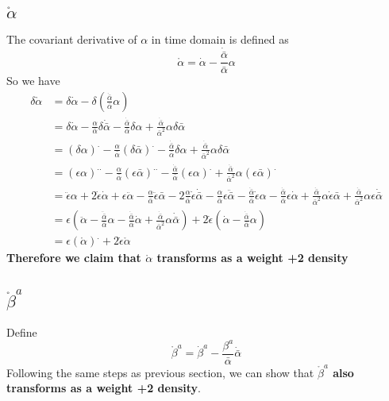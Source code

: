 \documentclass{article}
\begin{document}
\subsection{$\mathring{\alpha}$}
The covariant derivative of $\alpha$ in time domain is defined as
\[
\mathring{\alpha} = \dot{\alpha} - \frac{\dot{\bar{\alpha}}}{\bar{\alpha}}\alpha
\]
So we have
\begin{align*}
\delta \mathring{\alpha} & = \delta \dot{\alpha} - \delta (\frac{\dot{\bar{\alpha}}}{\bar{\alpha}}\alpha)\\
& = \delta \dot{\alpha} - \frac{\alpha}{\bar{\alpha}}\delta \dot{\bar{\alpha}} - \frac{\dot{\bar{\alpha}}}{\bar{\alpha}}\delta\alpha + \frac{\dot{\bar{\alpha}}}{\bar{\alpha}^2}\alpha \delta \bar{\alpha}\\
& = (\delta \alpha)^{.} - \frac{\alpha}{\bar{\alpha}}(\delta \bar{\alpha})^{.} - \frac{\dot{\bar{\alpha}}}{\bar{\alpha}}\delta\alpha + \frac{\dot{\bar{\alpha}}}{\bar{\alpha}^2}\alpha \delta \bar{\alpha}\\
& = (\epsilon \alpha)^{..} - \frac{\alpha}{\bar{\alpha}}(\epsilon \bar{\alpha})^{..} - \frac{\dot{\bar{\alpha}}}{\bar{\alpha}}(\epsilon\alpha)^{.} + \frac{\dot{\bar{\alpha}}}{\bar{\alpha}^2}\alpha (\epsilon \bar{\alpha})^{.}\\
& = \ddot{\epsilon}\alpha + 2\dot{\epsilon}\dot{\alpha} + \epsilon\ddot{\alpha} -  \frac{\alpha}{\bar{\alpha}}\ddot{\epsilon}\bar{\alpha} - 2 \frac{\alpha}{\bar{\alpha}}\dot{\epsilon}\dot{\bar{\alpha}} -  \frac{\alpha}{\bar{\alpha}}\epsilon\ddot{\bar{\alpha}} - \frac{\dot{\bar{\alpha}}}{\bar{\alpha}} \dot{\epsilon}\alpha - \frac{\dot{\bar{\alpha}}}{\bar{\alpha}}\epsilon\dot{\alpha} +  \frac{\dot{\bar{\alpha}}}{\bar{\alpha}^2}\alpha \dot{\epsilon}\bar{\alpha} +  \frac{\dot{\bar{\alpha}}}{\bar{\alpha}^2}\alpha \epsilon\dot{\bar{\alpha}}\\
& = \epsilon(\ddot{\alpha} - \frac{\ddot{\bar{\alpha}}}{\bar{\alpha}}\alpha - \frac{\dot{\bar{\alpha}}}{\bar{\alpha}}\dot{\alpha} + \frac{\dot{\bar{\alpha}}}{\bar{\alpha}^2}\alpha \dot{\bar{\alpha}}) + 2\dot{\epsilon}(\dot{\alpha} - \frac{\dot{\bar{\alpha}}}{\bar{\alpha}}\alpha)\\
& = \epsilon(\mathring{\alpha})^{.} + 2\dot{\epsilon}\mathring{\alpha}
\end{align*}
{\bf {\color{red} Therefore we claim that $\mathring{\alpha}$ transforms as a weight +2 density}}
\subsection{$\mathring{\beta}^{a}$}
Define
\[
\mathring{\beta}^{a} = {\dot \beta}^{a} - \frac{\beta^{a}}{{\bar \alpha}}{\dot {\bar \alpha}}
\]
Following the same steps as previous section, we can show that {\bf {\color{red} $\mathring{\beta}^{a}$ also transforms as a weight +2 density}}.
\end{document}
